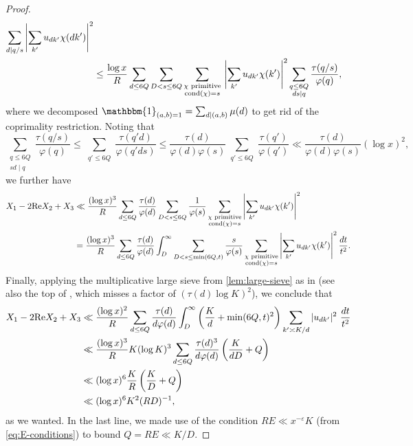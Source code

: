 \documentclass[reqno,11pt]{amsart}
\theoremstyle{definition}
\theoremstyle{remark}
\numberwithin{equation}{section}
\newcommand{\one}{\mathbbm{1}}
\renewcommand{\Re}{\textnormal{Re}}
\newcommand{\eps}{\varepsilon}
\newcommand{\cond}{\textnormal{cond}}
\begin{document}
\begin{proof}
\[\begin{aligned}
    \sum_{d \mid q/s} \left\vert \sum_{k'} u_{dk'} \chi(dk')\right\vert^2
    \\
    &\le
    \frac{\log x}{R}
    \sum_{d \le 6Q}
    \sum_{D < s \le 6Q}
    \sum_{\substack{\chi \text{ primitive} \\ \cond(\chi) = s}}\,
    \left\vert \sum_{k'} u_{dk'} \chi(k')\right\vert^2 
    \sum_{\substack{q \le 6Q \\ ds \mid q}}
    \frac{\tau(q/s)}{\varphi(q)},
\end{aligned}
\]
where we decomposed $\one_{(a, b) = 1} = \sum_{d \mid (a, b)} \mu(d)$ to get rid of the coprimality restriction. Noting that
\[
    \sum_{\substack{q \le 6Q \\ sd \mid q}}
    \frac{\tau(q/s)}{\varphi(q)}
    \le
    \sum_{\substack{q' \le 6Q}}
    \frac{\tau(q'd)}{\varphi(q'ds)}
    \le 
    \frac{\tau(d)}{\varphi(d)\varphi(s)}
    \sum_{\substack{q' \le 6Q}}
    \frac{\tau(q')}{\varphi(q')}
    \ll 
    \frac{\tau(d)}{\varphi(d)\varphi(s)} (\log x)^2,
\]
we further have
\[
\begin{aligned}
    X_1 - 2\Re X_2 + X_3 
    &\ll 
    \frac{(\log x)^3}{R}
    \sum_{d \le 6Q}
    \frac{\tau(d)}{\varphi(d)}
    \sum_{D < s \le 6Q}
    \frac{1}{\varphi(s)}
    \sum_{\substack{\chi \text{ primitive} \\ \cond(\chi) = s}}
    \left\vert \sum_{k'} u_{dk'} \chi(k')\right\vert^2 
    \\
    &=
    \frac{(\log x)^3}{R}
    \sum_{d \le 6Q}
    \frac{\tau(d)}{\varphi(d)}
    \int_D^\infty
    \sum_{D < s \le \min(6Q, t)}
    \frac{s}{\varphi(s)}
    \sum_{\substack{\chi \text{ primitive} \\ \cond(\chi) = s}}
    \left\vert \sum_{k'} u_{dk'} \chi(k')\right\vert^2 \frac{dt}{t^2}.
\end{aligned} 
\]
Finally, applying the multiplicative large sieve from \cref{lem:large-sieve} as in \cite[p.\ 900]{drappeau2017smooth} (see also the top of \cite[p.\ 852]{drappeau2015theoremes}, which misses a factor of $(\tau(d) \log K)^2$), we conclude that
\[ 
\begin{aligned}
    X_1 - 2 \Re X_2 + X_3
    &\ll 
    \frac{(\log x)^2}{R} \sum_{d \le 6Q} \frac{\tau(d)}{d\varphi(d)} \int_D^\infty \left(\frac{K}{d} + \min(6Q, t)^2 \right) \sum_{k' \asymp K/d} |u_{dk'}|^2\ \frac{dt}{t^2}
    \\
    &\ll 
    \frac{(\log x)^3}{R} K (\log K)^3 \sum_{d \le 6Q} \frac{\tau(d)^3}{d\varphi(d)} \left( \frac{K}{dD} + Q \right)
    \\
    &\ll
    (\log x)^6 \frac{K}{R} \left(\frac{K}{D} + Q\right)
    \\
    &\ll 
    (\log x)^6 K^2 (RD)^{-1},
\end{aligned}
\]
as we wanted. In the last line, we made use of the condition $RE \ll x^{-\eps}K$ (from \cref{eq:E-conditions}) to bound $Q = RE \ll K/D$. 
\end{proof}
\end{document}
